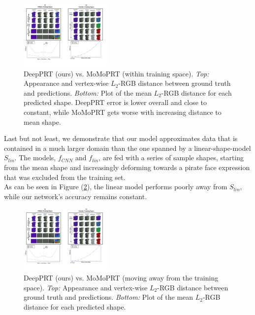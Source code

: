 \begin{figure}[h]
  \centering
    \includegraphics[width=0.4\textwidth]{Figures/DPRT_vs_MoMoPRT_a.pdf}
     \caption{DeepPRT (ours) vs. MoMoPRT (within training space).\textit{ Top:} Appearance and vertex-wise $L_2$-RGB distance between ground truth and predictions.\textit{ Bottom:} Plot of the mean $L_2$-RGB distance for each predicted shape. DeepPRT error is lower overall and close to constant, while MoMoPRT gets worse with increasing distance to mean shape.}
     \label{Fig:DPRT vs MoMoPRT A}
\end{figure}
Last but not least, we demonstrate that our model approximates data that is contained in a much larger domain than the one spanned by a linear-shape-model $S_{lin}$. The models, $f_{CNN}$ and $f_{lin}$, are fed with a series of sample shapes, starting from the mean shape and increasingly deforming towards a pirate face expression that was excluded from the training set. \\
As can be seen in Figure (\ref{Fig:DPRT vs MoMoPRT B}), the linear model performs poorly away from $S_{lin}$, while our network's accuracy remains constant.
\begin{figure}[h]
  \centering
    \includegraphics[width=0.4\textwidth]{Figures/DPRT_vs_MoMoPRT_b.pdf}
     \caption{DeepPRT (ours) vs. MoMoPRT (moving away from the training space). \textit{Top:} Appearance and vertex-wise $L_2$-RGB distance between ground truth and predictions.\textit{ Bottom:} Plot of the mean $L_2$-RGB distance for each predicted shape.}
     \label{Fig:DPRT vs MoMoPRT B}
\end{figure}


